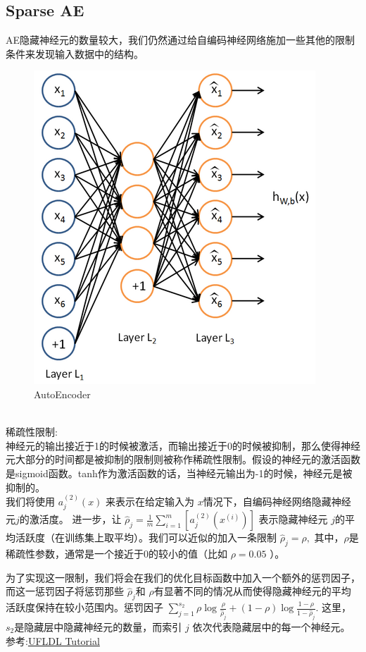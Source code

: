 \documentclass{article}
\begin{document}
\subsection{Sparse AE}
AE隐藏神经元的数量较大，我们仍然通过给自编码神经网络施加一些其他的限制条件来发现输入数据中的结构。\\
\begin{figure}[h]
\centering
\includegraphics[height=0.5\linewidth]{4.png}
\caption{AutoEncoder}
\end{figure}\\
稀疏性限制:\\
神经元的输出接近于1的时候被激活，而输出接近于0的时候被抑制，那么使得神经元大部分的时间都是被抑制的限制则被称作稀疏性限制。假设的神经元的激活函数是sigmoid函数。tanh作为激活函数的话，当神经元输出为-1的时候，神经元是被抑制的。\\
我们将使用 $\textstyle a^{(2)}_j(x)$ 来表示在给定输入为 $\textstyle x $情况下，自编码神经网络隐藏神经元$ \textstyle j $的激活度。 进一步，让
$\hat\rho_j = \frac{1}{m} \sum_{i=1}^m \left[ a^{(2)}_j(x^{(i)}) \right]$
表示隐藏神经元 $\textstyle j $的平均活跃度（在训练集上取平均）。我们可以近似的加入一条限制
$\hat\rho_j = \rho,$
其中，$ \textstyle \rho$是稀疏性参数，通常是一个接近于0的较小的值（比如 $\textstyle \rho = 0.05$ ）。

为了实现这一限制，我们将会在我们的优化目标函数中加入一个额外的惩罚因子，而这一惩罚因子将惩罚那些 $\textstyle \hat\rho_j $和 $\textstyle \rho $有显著不同的情况从而使得隐藏神经元的平均活跃度保持在较小范围内。惩罚因子
$
\sum_{j=1}^{s_2} \rho \log \frac{\rho}{\hat\rho_j} + (1-\rho) \log \frac{1-\rho}{1-\hat\rho_j}.
$
这里， $\textstyle s_2 $是隐藏层中隐藏神经元的数量，而索引 $\textstyle j$ 依次代表隐藏层中的每一个神经元。
\\
参考:\href{http://deeplearning.stanford.edu/wiki/index.php/Autoencoders_and_Sparsity}{UFLDL Tutorial}
\end{document}
